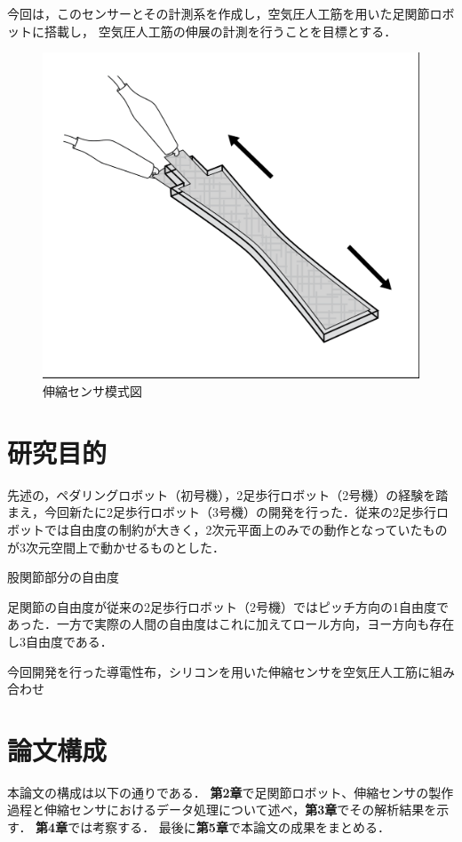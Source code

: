 今回は，このセンサーとその計測系を作成し，空気圧人工筋を用いた足関節ロボットに搭載し，
空気圧人工筋の伸展の計測を行うことを目標とする．
\begin{figure}[h]
    \begin{center}
        \includegraphics[width=0.5\columnwidth,bb=0 0 906 785]{Photo/1.緒言/MITSoftRobotics.png}
        \caption{伸縮センサ模式図\cite{MITSoftRobot}}
        \label{MITSoftRobot表紙}
    \end{center}
\end{figure}


\section{研究目的}

先述の，ペダリングロボット（初号機），2足歩行ロボット（2号機）の経験を踏まえ，今回新たに2足歩行ロボット（3号機）の開発を行った．従来の2足歩行ロボットでは自由度の制約が大きく，2次元平面上のみでの動作となっていたものが3次元空間上で動かせるものとした．

股関節部分の自由度

足関節の自由度が従来の2足歩行ロボット（2号機）ではピッチ方向の1自由度であった．一方で実際の人間の自由度はこれに加えてロール方向，ヨー方向も存在し3自由度である．

今回開発を行った導電性布，シリコンを用いた伸縮センサを空気圧人工筋に組み合わせ


\section{論文構成}
本論文の構成は以下の通りである．
{\bf 第2章}で足関節ロボット、伸縮センサの製作過程と伸縮センサにおけるデータ処理について述べ，{\bf 第3章}でその解析結果を示す．
{\bf 第4章}では考察する． %
最後に{\bf 第5章}で本論文の成果をまとめる．
